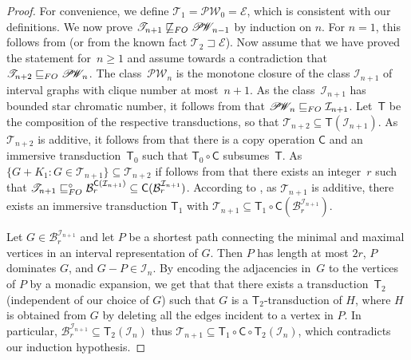 \documentclass{lmcs}
\newcommand{\Ee}{\ensuremath{\mathscr E}}
\newcommand{\PW}{\mathscr{P\!W\!}}
\newcommand{\Tt}{\mathscr{T}}
\renewcommand{\FO}{{\rm FO}}
\newcommand{\rloc}[2]{\ensuremath{\mathcal{B}_{#1}^{#2}}}
\theoremstyle{definition}
\begin{document}
\begin{proof}
	For convenience, we define $\Tt_1=\PW_0=\Ee$, which is consistent with our definitions.
 We now prove $\Tt_{n+1}\not\sqsubseteq_\FO\PW_{n-1}$
	by induction on $n$. For $n=1$, this follows from  (or from the known fact $\Tt_2\sqsupset\Ee$). 
	Now assume that we have proved the statement for~$n\geq 1$ and assume towards a contradiction that $\Tt_{n+2}\sqsubseteq_\FO\PW_{n}$.
	The class~$\PW_{n}$ is the monotone closure of the class $\mathcal{I}_{n+1}$ of interval graphs with clique number at most~$n+1$. As the class~$\mathcal{I}_{n+1}$ has bounded star chromatic number, it follows from  that $\PW_{n}\sqsubseteq_\FO\mathcal{I}_{n+1}$. Let~$\mathsf T$ be the composition of the respective transductions, so that  $\Tt_{n+2}\subseteq\mathsf T(\mathcal{I}_{n+1})$.
	As $\Tt_{n+2}$ is additive, 
	it follows from  that there is a copy operation $\mathsf C$ and an immersive transduction~$\mathsf{T}_0$ such that $\mathsf T_0\circ \mathsf C$ subsumes~$\mathsf T$.
	As $\{G+K_1: G\in\Tt_{n+1}\}\subseteq \Tt_{n+2}$ if follows from  that there exists an integer~$r$ such that $\Tt_{n+1}\sqsubseteq^\circ_\FO \rloc{r}{\mathsf C(\mathcal I_{n+1})}\subseteq \mathsf C(\rloc{r}{\mathcal I_{n+1}})$. According to , as $\Tt_{n+1}$ is additive, there exists an immersive transduction $\mathsf{T}_1$ with $\Tt_{n+1}\subseteq \mathsf T_1\circ\mathsf C(\rloc{r}{\mathcal I_{n+1}})$.
	
	Let $G\in \rloc{r}{\mathcal I_{n+1}}$ and let $P$ be a shortest path connecting the 
	minimal and maximal vertices in an interval representation of $G$. Then $P$ has length at most $2r$, $P$ dominates $G$, and  $G-P\in\mathcal I_n$. 
	By encoding the adjacencies in~$G$ to the vertices of $P$ by a monadic expansion, we get that that there exists a transduction~$\mathsf T_2$ (independent of our choice of $G$) such that $G$ is a $\mathsf T_2$-transduction of $H$, where $H$ is obtained from $G$ by deleting all the edges incident to a  vertex in $P$. 
	In particular, $\rloc{r}{\mathcal I_{n+1}}\subseteq\mathsf T_2(\mathcal I_n)$ thus
	$\Tt_{n+1}\subseteq\mathsf T_1\circ\mathsf C\circ\mathsf T_2(\mathcal I_n)$, which contradicts our induction hypothesis. 
\end{proof}
\end{document}
